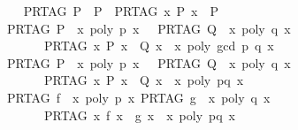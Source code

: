 \begin{isabellebody}
\ \ \isanewline
\ \ {\isachardoublequoteopen}PR{\isacharunderscore}TAG\ P\ {\isacharequal}\ P{\isacharprime}\ {\isasymLongrightarrow}\ PR{\isacharunderscore}TAG\ {\isacharparenleft}{\isasymlambda}x{\isachardot}\ {\isasymnot}{\isacharparenleft}{\isasymnot}P\ x{\isacharparenright}{\isacharparenright}\ {\isacharequal}\ P{\isacharprime}{\isachardoublequoteclose}\isanewline
\ \ {\isachardoublequoteopen}{\isasymlbrakk}PR{\isacharunderscore}TAG\ P\ {\isacharequal}\ {\isacharparenleft}{\isasymlambda}x{\isachardot}\ poly\ p\ x\ {\isacharequal}\ {}{\isacharparenright}{\isacharsemicolon}\ PR{\isacharunderscore}TAG\ Q\ {\isacharequal}\ {\isacharparenleft}{\isasymlambda}x{\isachardot}\ poly\ q\ x\ {\isacharequal}\ {}{\isacharparenright}{\isasymrbrakk}\isanewline
\ \ \ \ \ \ \ {\isasymLongrightarrow}\ PR{\isacharunderscore}TAG\ {\isacharparenleft}{\isasymlambda}x{\isachardot}\ P\ x\ {\isasymand}\ Q\ x{\isacharparenright}\ {\isacharequal}\ {\isacharparenleft}{\isasymlambda}x{\isachardot}\ poly\ {\isacharparenleft}gcd\ p\ q{\isacharparenright}\ x\ {\isacharequal}\ {}{\isacharparenright}{\isachardoublequoteclose}\ \isanewline
\ {\isachardoublequoteopen}\ {\isasymlbrakk}PR{\isacharunderscore}TAG\ P\ {\isacharequal}\ {\isacharparenleft}{\isasymlambda}x{\isachardot}\ poly\ p\ x\ {\isacharequal}\ {}{\isacharparenright}{\isacharsemicolon}\ PR{\isacharunderscore}TAG\ Q\ {\isacharequal}\ {\isacharparenleft}{\isasymlambda}x{\isachardot}\ poly\ q\ x\ {\isacharequal}\ {}{\isacharparenright}{\isasymrbrakk}\isanewline
\ \ \ \ \ \ \ {\isasymLongrightarrow}\ PR{\isacharunderscore}TAG\ {\isacharparenleft}{\isasymlambda}x{\isachardot}\ P\ x\ {\isasymor}\ Q\ x{\isacharparenright}\ {\isacharequal}\ {\isacharparenleft}{\isasymlambda}x{\isachardot}\ poly\ {\isacharparenleft}p{\isacharasterisk}q{\isacharparenright}\ x\ {\isacharequal}\ {}{\isacharparenright}{\isachardoublequoteclose}\ \isanewline
\isanewline
\ \ {\isachardoublequoteopen}{\isasymlbrakk}PR{\isacharunderscore}TAG\ f\ {\isacharequal}\ {\isacharparenleft}{\isasymlambda}x{\isachardot}\ poly\ p\ x{\isacharparenright}{\isacharsemicolon}\ PR{\isacharunderscore}TAG\ g\ {\isacharequal}\ {\isacharparenleft}{\isasymlambda}x{\isachardot}\ poly\ q\ x{\isacharparenright}{\isasymrbrakk}\isanewline
\ \ \ \ \ \ \ {\isasymLongrightarrow}\ PR{\isacharunderscore}TAG\ {\isacharparenleft}{\isasymlambda}x{\isachardot}\ f\ x\ {\isacharequal}\ g\ x{\isacharparenright}\ {\isacharequal}\ {\isacharparenleft}{\isasymlambda}x{\isachardot}\ poly\ {\isacharparenleft}p{\isacharminus}q{\isacharparenright}\ x\ {\isacharequal}\ {}{\isacharparenright}{\isachardoublequoteclose}\isanewline

\end{isabellebody}
